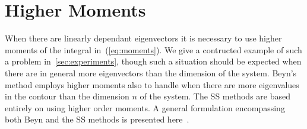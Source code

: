 \documentclass[onefignum,onetabnum]{siamart190516}
\begin{document}
\section{Higher Moments}
\label{sec:moments}
When there are linearly dependant eigenvectors it is necessary to use higher moments of the integral in~(\ref{eq:moments}).
We give a contructed example of such a problem in~\autoref{sec:experiments}, though such a situation should be expected when there are in general more eigenvectors than the dimension of the system.
Beyn's method employs higher moments also to handle when there are more eigenvalues in the contour than the dimension \( n \) of the system. 
The SS methods are based entirely on using higher order moments.
A general formulation encompassing both Beyn and the SS methods is presented here~\cite{guttel2017}.
\end{document}
